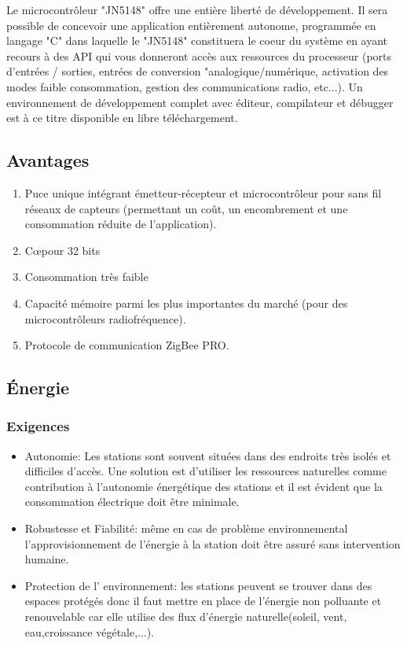 Le microcontrôleur "JN5148" offre une entière liberté de développement. Il sera possible de concevoir une application entièrement autonome, programmée en langage "C" dans laquelle le "JN5148" constituera le coeur du système en ayant recours à des API qui vous donneront accès aux ressources du processeur (ports d'entrées / sorties, entrées de conversion "analogique/numérique, activation des modes faible consommation, gestion des communications radio, etc...). Un environnement de développement complet avec éditeur, compilateur et débugger est à ce titre disponible en libre téléchargement.

\subsection{Avantages}  

\begin{enumerate}
	\item  Puce unique intégrant émetteur-récepteur et microcontrôleur pour sans fil réseaux de capteurs (permettant un coût, un encombrement et une consommation réduite de l’application).
	\item Cœpour 32 bits
	\item Consommation très faible  
	\item Capacité mémoire parmi les plus importantes du marché (pour des microcontrôleurs radiofréquence).
	\item Protocole de communication ZigBee PRO.
\end{enumerate}

\subsection{Énergie}

\subsubsection{Exigences}
\begin{itemize}

\item Autonomie: Les stations sont souvent situées dans des endroits très isolés et difficiles d'accès. Une solution est d'utiliser les ressources naturelles comme contribution à l'autonomie énergétique des stations et il est évident que la consommation électrique doit être minimale.

\smallskip \item Robustesse et Fiabilité: même en cas de problème environnemental l'approvisionnement de l'énergie à la station doit être assuré sans intervention humaine.

\smallskip \item Protection de l' environnement: les stations peuvent se trouver dans des espaces protégés donc il faut mettre en place de l'énergie non polluante et renouvelable car elle utilise des flux d'énergie naturelle(soleil, vent, eau,croissance végétale,...).
\end{itemize}

